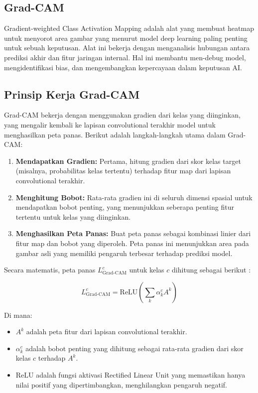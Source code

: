 \subsection{Grad-CAM}
\label{sec:225}

Gradient-weighted Class Activation Mapping adalah alat yang membuat heatmap untuk menyorot area gambar yang menurut model deep learning paling penting untuk sebuah keputusan. Alat ini bekerja dengan menganalisis hubungan antara prediksi akhir dan fitur jaringan internal. Hal ini membantu men-debug model, mengidentifikasi bias, dan mengembangkan kepercayaan dalam keputusan AI.

\subsection{Prinsip Kerja Grad-CAM}

Grad-CAM bekerja dengan menggunakan gradien dari kelas yang diinginkan, yang mengalir kembali ke lapisan convolutional terakhir model untuk menghasilkan peta panas. Berikut adalah langkah-langkah utama dalam Grad-CAM:

\begin{enumerate}
    \item \textbf{Mendapatkan Gradien:} Pertama, hitung gradien dari skor kelas target (misalnya, probabilitas kelas tertentu) terhadap fitur map dari lapisan convolutional terakhir.
    \item \textbf{Menghitung Bobot:} Rata-rata gradien ini di seluruh dimensi spasial untuk mendapatkan bobot penting, yang menunjukkan seberapa penting fitur tertentu untuk kelas yang diinginkan.
    \item \textbf{Menghasilkan Peta Panas:} Buat peta panas sebagai kombinasi linier dari fitur map dan bobot yang diperoleh. Peta panas ini menunjukkan area pada gambar asli yang memiliki pengaruh terbesar terhadap prediksi model.
\end{enumerate}

Secara matematis, peta panas \(L_{\text{Grad-CAM}}^c\) untuk kelas \(c\) dihitung sebagai berikut \cite{selvaraju2017grad}:

\[
L_{\text{Grad-CAM}}^c = \text{ReLU}\left(\sum_k \alpha_k^c A^k\right)
\]

Di mana:

\begin{itemize}
    \item \(A^k\) adalah peta fitur dari lapisan convolutional terakhir.
    \item \(\alpha_k^c\) adalah bobot penting yang dihitung sebagai rata-rata gradien dari skor kelas \(c\) terhadap \(A^k\).
    \item \(\text{ReLU}\) adalah fungsi aktivasi Rectified Linear Unit yang memastikan hanya nilai positif yang dipertimbangkan, menghilangkan pengaruh negatif.
\end{itemize}

